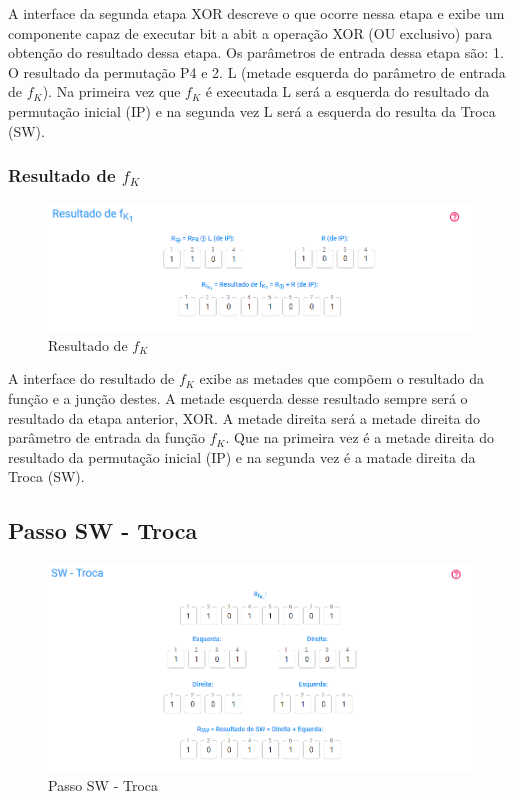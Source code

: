 A interface da segunda etapa XOR descreve o que ocorre nessa etapa e exibe um componente capaz de executar bit a abit a operação XOR (OU exclusivo) para obtenção do resultado dessa etapa. Os parâmetros de entrada dessa etapa são: 1. O resultado da permutação P4 e 2. L (metade esquerda do parâmetro de entrada de \(f_K\)). Na primeira vez que \(f_K\) é executada L será a esquerda do resultado da permutação inicial (IP) e na segunda vez L será a esquerda do resulta da Troca (SW).

\subsubsection{Resultado de \(f_K\)}

\begin{figure}[H]
    \centering
    \caption{Resultado de \(f_K\)}
    \includegraphics[width=1\linewidth]{UI/UIRFK1.png}
\end{figure}

A interface do resultado de \(f_K\) exibe as metades que compõem o resultado da função e a junção destes. A metade esquerda desse resultado sempre será o resultado da etapa anterior, XOR. A metade direita será a metade direita do parâmetro de entrada da função \(f_K\). Que na primeira vez é a metade direita do resultado da permutação inicial (IP) e na segunda vez é a matade direita da Troca (SW).

\subsection{Passo SW - Troca}

\begin{figure}[H]
    \centering
    \caption{Passo SW - Troca}
    \includegraphics[width=1\linewidth]{UI/UISW.png}
\end{figure}


